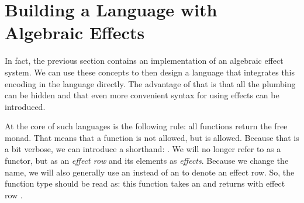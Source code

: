 %
%

\section{Building a Language with Algebraic Effects}

 In fact, the previous section contains an implementation of an algebraic effect system. We can use these concepts to then design a language that integrates this encoding in the language directly. The advantage of that is that all the plumbing can be hidden and that even more convenient syntax for using effects can be introduced.

At the core of such languages is the following rule: all functions return the free monad. That means that a function  is not allowed, but  is allowed. Because that is a bit verbose, we can introduce a shorthand: . We will no longer refer to  as a functor, but as an \emph{effect row} and its elements as \emph{effects}. Because we change the name, we will also generally use an  instead of an  to denote an effect row. So, the function type  should be read as: this function takes an  and returns  with effect row .


